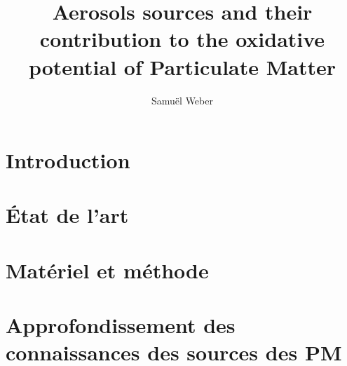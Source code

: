 \documentclass[a4paper,12pt]{book}
\author{Samuël Weber}
\title{Aerosols sources and their contribution to the oxidative potential of Particulate Matter}
\begin{document}
% 
\maketitle

\frontmatter

\clearpage
% 
%

\tableofcontents
\listoftables
\listoffigures


\mainmatter

\chapter*{Introduction}%
\label{cha:introduction}

\clearpage
\printbibliography[segment=\therefsegment,heading=subbibliography]

\chapter{État de l'art}
\label{cha:etat_de_lart}
\PartialToc
\clearpage

\clearpage
\printbibliography[segment=\therefsegment,heading=subbibliography]

\chapter{Matériel et méthode}
\label{cha:materiel_et_methode}
\PartialToc
\clearpage

\clearpage
\printbibliography[segment=\therefsegment,heading=subbibliography]

\chapter{Approfondissement des connaissances des sources des PM}%
\label{cha:approfondissement_des_connaissances_des_sources_des_pm}
\PartialToc
\clearpage

\clearpage
\printbibliography[segment=\therefsegment,heading=subbibliography]
\end{document}
